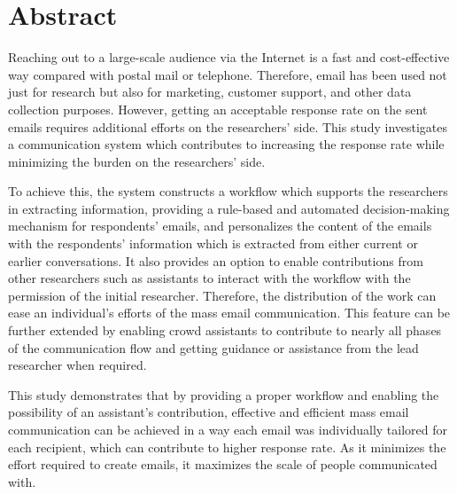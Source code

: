 {}
{}	

\chapter*{Abstract}

Reaching out to a large-scale audience via the Internet is a fast and cost-effective way compared with postal mail or telephone. Therefore, email has been used not just for research but also for marketing, customer support, and other data collection purposes. However, getting an acceptable response rate on the sent emails requires additional efforts on the researchers' side. This study investigates a communication system which contributes to increasing the response rate while minimizing the burden on the researchers' side. 
\vspace{1cm}

To achieve this, the system constructs a workflow which supports the researchers in extracting information, providing a rule-based and automated decision-making mechanism for respondents' emails, and personalizes the content of the emails with the respondents' information which is extracted from either current or earlier conversations. It also provides an option to enable contributions from other researchers such as assistants to interact with the workflow with the permission of the initial researcher. Therefore, the distribution of the work can ease an individual's efforts of the mass email communication. This feature can be further extended by enabling crowd assistants to contribute to nearly all phases of the communication flow and getting guidance or assistance from the lead researcher when required.
\vspace{1cm}

This study demonstrates that by providing a proper workflow and enabling the possibility of an assistant's contribution, effective and efficient mass email communication can be achieved in a way each email was individually tailored for each recipient, which can contribute to higher response rate. As it minimizes the effort required to create emails, it maximizes the scale of people communicated with.
